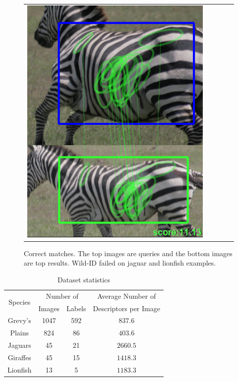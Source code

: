 \begin{figure}
\begin{center}
\begin{tabular}{c c c c c}
\includegraphics[height=\correctmatchheight]{figures/FinalImages/cropped/PZ_correct_318_cropped}
\end{tabular}
\caption{\footnotesize{Correct matches. The top images are queries and the bottom images are top results. Wild-ID failed on jaguar and lionfish examples.}}
\label{fig:correctall}
\end{center}
\end{figure}


\begin{table}
\centering
\footnotesize{
\begin{tabular}{|c | c c | c |}
\hline
\multirow{2}{*}{ Species }   & \multicolumn{2}{c|}{Number of}  &  Average Number of     \\
                             &  Images &   Labels              & Descriptors per Image  \\
\hline
Grevy's    & 1047 & 592 & $ 837.6$  \\
Plains     & 824  & 86  & $ 403.6$ \\
Jaguars    & 45   & 21  & $2660.5$ \\
Giraffes   & 45   & 15  & $1418.3$ \\
Lionfish  & 13   & 5   & $1183.3$ \\
\hline
\end{tabular}
\caption{\footnotesize{Dataset statistics}}
\label{tab:dbstats}
}
\end{table}

